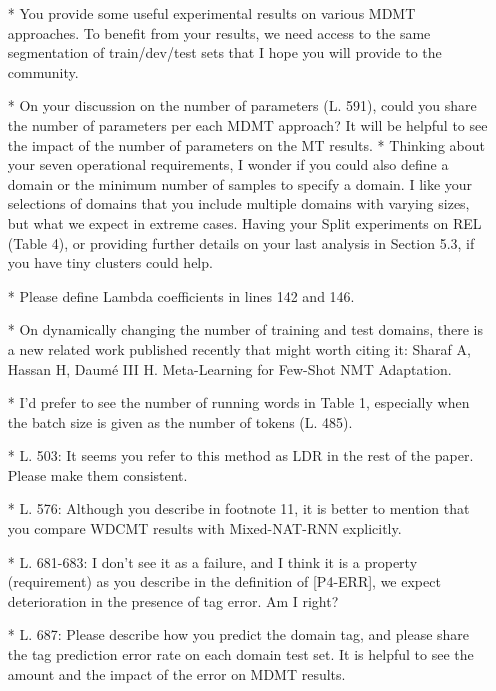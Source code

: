 \documentclass[12pt,times,a4paper,twoside]{article}
\begin{document}
\begin{itemize}
\item[*] You provide some useful experimental results on various MDMT approaches. To benefit from your results, we need access to the same segmentation of train/dev/test sets that I hope you will provide to the community.
\item[*] On your discussion on the number of parameters (L. 591), could you share the number of parameters per each MDMT approach? It will be helpful to see the impact of the number of parameters on the MT results.  * Thinking about your seven operational requirements, I wonder if you could also define a domain or the minimum number of samples to specify a domain. I like your selections of domains that you include multiple domains with varying sizes, but what we expect in extreme cases. Having your Split experiments on REL (Table 4), or providing further details on your last analysis in Section 5.3, if you have tiny clusters could help.
\item[*] Please define Lambda coefficients in lines 142 and 146.
\item[*] On dynamically changing the number of training and test domains, there is a new related work published recently that might worth citing it: Sharaf A, Hassan H, Daumé III H. Meta-Learning for Few-Shot NMT Adaptation.
\item[*] I’d prefer to see the number of running words in Table 1, especially when the batch size is given as the number of tokens (L. 485).
\item[*] L. 503: It seems you refer to this method as LDR in the rest of the paper. Please make them consistent.
\item[*] L. 576: Although you describe in footnote 11, it is better to mention that you compare WDCMT results with Mixed-NAT-RNN explicitly.
\item[*] L. 681-683: I don’t see it as a failure, and I think it is a property (requirement) as you describe in the definition of [P4-ERR], we expect deterioration in the presence of tag error. Am I right?
\item[*]  L. 687: Please describe how you predict the domain tag, and please share the tag prediction error rate on each domain test set. It is helpful to see the amount and the impact of the error on MDMT results.
\end{itemize}
\end{document}

